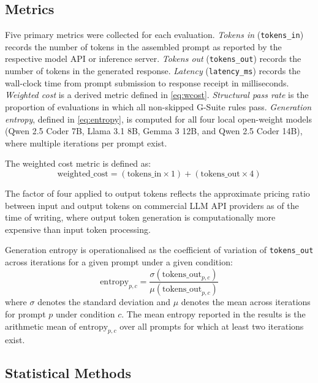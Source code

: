 \documentclass[review,12pt,3p]{elsarticle}
\begin{document}
\subsection{Metrics}

Five primary metrics were collected for each evaluation. \emph{Tokens in}
(\texttt{tokens\_in}) records the number of tokens in the assembled prompt as reported by
the respective model API or inference server. \emph{Tokens out} (\texttt{tokens\_out})
records the number of tokens in the generated response. \emph{Latency} (\texttt{latency\_ms})
records the wall-clock time from prompt submission to response receipt in milliseconds.
\emph{Weighted cost} is a derived metric defined in \cref{eq:wcost}. \emph{Structural
pass rate} is the proportion of evaluations in which all non-skipped G-Suite rules pass.
\emph{Generation entropy}, defined in \cref{eq:entropy}, is computed for all four local
open-weight models (Qwen 2.5 Coder 7B, Llama 3.1 8B, Gemma 3 12B, and Qwen 2.5 Coder 14B),
where multiple iterations per prompt exist.

The weighted cost metric is defined as:
\begin{equation}
  \text{weighted\_cost} = (\text{tokens\_in} \times 1) + (\text{tokens\_out} \times 4)
  \label{eq:wcost}
\end{equation}

The factor of four applied to output tokens reflects the approximate pricing ratio between
input and output tokens on commercial LLM API providers as of the time of writing, where
output token generation is computationally more expensive than input token processing.

Generation entropy is operationalised as the coefficient of variation of \texttt{tokens\_out}
across iterations for a given prompt under a given condition:
\begin{equation}
  \text{entropy}_{p,c} = \frac{\sigma(\text{tokens\_out}_{p,c})}{\mu(\text{tokens\_out}_{p,c})}
  \label{eq:entropy}
\end{equation}
where $\sigma$ denotes the standard deviation and $\mu$ denotes the mean across iterations
for prompt $p$ under condition $c$. The mean entropy reported in the results is the
arithmetic mean of $\text{entropy}_{p,c}$ over all prompts for which at least two iterations
exist.

\subsection{Statistical Methods}
\end{document}
